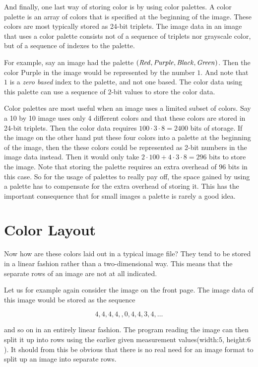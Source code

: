 And finally, one last way of storing color is by using color
palettes. A color palette is an array of colors that is specified at
the beginning of the image. These colors are most typically stored as
24-bit \rgb triplets. The image data in an image that uses a color
palette consists not of a sequence of triplets nor grayscale
color, but of a sequence of indexes to the palette.

For example, say an image had the palette $(\mathit{Red}, \mathit{Purple}, \mathit{Black},
\mathit{Green})$. Then the color Purple in the image would be represented by
the number $1$. And note that $1$ is a \textit{zero based} index to
the palette, and not one based. The color data using this palette can
use a sequence of 2-bit values to store the color data.

Color palettes are most useful when an image uses a limited subset of
colors. Say a 10 by 10 image uses only 4 different colors and that
these colors are stored in 24-bit triplets. Then the color data
requires $100 \cdot 3 \cdot 8 = 2400$ bits of storage. If the image on
the other hand put these four colors into a palette at the beginning
of the image, then the these colors could be represented as 2-bit
numbers in the image data instead. Then it would only take $2 \cdot
100 + 4 \cdot 3 \cdot 8 = 296$ bits to store the image. Note that
storing the palette requires an extra overhead of $96$ bits in this
case. So for the usage of palettes to really pay off, the space gained
by using a palette has to compensate for the extra overhead of storing
it. This has the important consequence that for small images a palette
is rarely a good idea.

\section{Color Layout}
\label{sec:color-layout}

Now how are these colors laid out in a typical image file? They tend
to be stored in a linear fashion rather than a two-dimensional
way. This means that the separate rows of an image are not at all
indicated.

Let us for example again consider the image on the front page. The
image data of this image would be stored as the sequence

\begin{equation*}
  4,4,4,4,,0,4,4,3,4,\dots
\end{equation*}

and so on in an entirely linear fashion. The program reading the image
can then split it up into rows using the earlier given measurement
values(width:$5$, height:$6$). It should from this be obvious that
there is no real need for an image format to split up an image into
separate rows.


